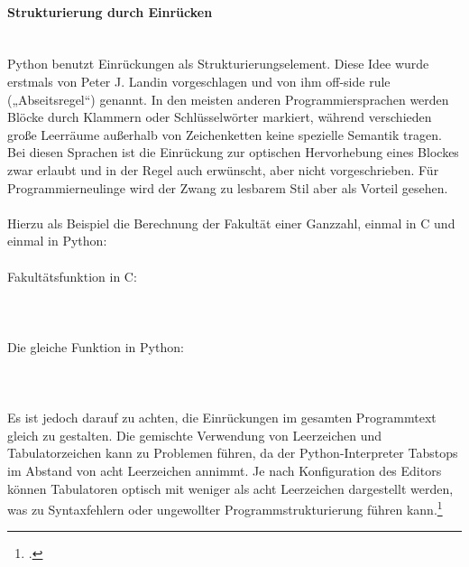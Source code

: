 \paragraph{Strukturierung durch Einrücken}\ \\
Python benutzt Einrückungen als Strukturierungselement. Diese Idee wurde erstmals von Peter J. Landin vorgeschlagen und von ihm off-side rule („Abseitsregel“) genannt. In den meisten anderen Programmiersprachen werden Blöcke durch Klammern oder Schlüsselwörter markiert, während verschieden große Leerräume außerhalb von Zeichenketten keine spezielle Semantik tragen. Bei diesen Sprachen ist die Einrückung zur optischen Hervorhebung eines Blockes zwar erlaubt und in der Regel auch erwünscht, aber nicht vorgeschrieben. Für Programmierneulinge wird der Zwang zu lesbarem Stil aber als Vorteil gesehen.\\
\\
Hierzu als Beispiel die Berechnung der Fakultät einer Ganzzahl, einmal in C und einmal in Python:\\
\\
Fakultätsfunktion in C:\\
\\
\\
\\
Die gleiche Funktion in Python:\\
\\
\\
\\
Es ist jedoch darauf zu achten, die Einrückungen im gesamten Programmtext gleich zu gestalten. Die gemischte Verwendung von Leerzeichen und Tabulatorzeichen kann zu Problemen führen, da der Python-Interpreter Tabstops im Abstand von acht Leerzeichen annimmt. Je nach Konfiguration des Editors können Tabulatoren optisch mit weniger als acht Leerzeichen dargestellt werden, was zu Syntaxfehlern oder ungewollter Programmstrukturierung führen kann.\footcite{python_wiki}\\
